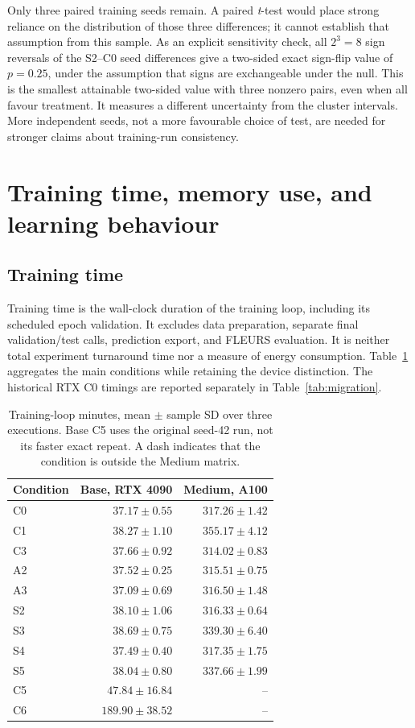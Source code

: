 \documentclass[12pt,a4paper]{report}
\begin{document}
Only three paired training seeds remain. A paired \emph{t}-test would place
strong reliance on the distribution of those three differences; it cannot
establish that assumption from this sample. As an explicit sensitivity check,
all $2^3=8$ sign reversals of the S2--C0 seed differences give a two-sided
exact sign-flip value of $p=0.25$, under the assumption that signs are
exchangeable under the null. This is the smallest attainable two-sided value
with three nonzero pairs, even when all favour treatment. It measures a
different uncertainty from the cluster intervals. More independent seeds,
not a more favourable choice of test, are needed for stronger claims about
training-run consistency.

\section{Training time, memory use, and learning behaviour}
\label{sec:resources}

\subsection{Training time}

Training time is the wall-clock duration of the training loop, including its
scheduled epoch validation. It excludes data preparation, separate final
validation/test calls, prediction export, and FLEURS evaluation. It is neither
total experiment turnaround time nor a measure of energy consumption.
Table~\ref{tab:time} aggregates the main conditions while retaining the
device distinction. The historical RTX C0 timings are reported separately
in Table~\ref{tab:migration}.

\begin{table}[htbp]\centering\small
\caption{Training-loop minutes, mean $\pm$ sample SD over three executions.
Base C5 uses the original seed-42 run, not its faster exact repeat.
A dash indicates that the condition is outside the Medium matrix.}
\label{tab:time}
\begin{tabular}{lrr}\toprule
Condition & Base, RTX 4090 & Medium, A100\\\midrule
C0 & $37.17 \pm 0.55$ & $317.26 \pm 1.42$ \\
C1 & $38.27 \pm 1.10$ & $355.17 \pm 4.12$ \\
C3 & $37.66 \pm 0.92$ & $314.02 \pm 0.83$ \\
A2 & $37.52 \pm 0.25$ & $315.51 \pm 0.75$ \\
A3 & $37.09 \pm 0.69$ & $316.50 \pm 1.48$ \\
S2 & $38.10 \pm 1.06$ & $316.33 \pm 0.64$ \\
S3 & $38.69 \pm 0.75$ & $339.30 \pm 6.40$ \\
S4 & $37.49 \pm 0.40$ & $317.35 \pm 1.75$ \\
S5 & $38.04 \pm 0.80$ & $337.66 \pm 1.99$ \\
C5 & $47.84 \pm 16.84$ & -- \\
C6 & $189.90 \pm 38.52$ & -- \\
\bottomrule\end{tabular}\end{table}
\end{document}
